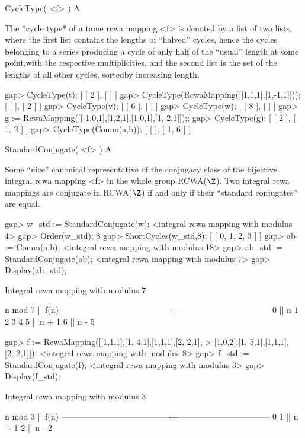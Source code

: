 \>CycleType( <f> ) A

The *cycle type* of a tame rcwa mapping <f> is denoted by a list of two
lists, where the first list contains the lengths of ``halved'' cycles,
hence the cycles belonging to a series producing a cycle of only half
of the ``usual'' length at some point,with the respective
multiplicities, and the second list is the set of the lengths of all
other cycles, sortedby increasing length.

\beginexample
gap> CycleType(t);
[ [ 2 ], [  ] ]
gap> CycleType(RcwaMapping([[1,1,1],[1,-1,1]]));
[ [  ], [ 2 ] ]
gap> CycleType(v);
[ [ 6 ], [  ] ]
gap> CycleType(w);
[ [ 8 ], [  ] ]
gap> g := RcwaMapping([[-1,0,1],[1,2,1],[1,0,1],[1,-2,1]]);;
gap> CycleType(g);
[ [ 2 ], [ 1, 2 ] ]
gap> CycleType(Comm(a,b));
[ [  ], [ 1, 6 ] ]
\endexample

\>StandardConjugate( <f> ) A

Some ``nice'' canonical representative of the conjugacy class of the
bijective integral rcwa mapping <f> in the whole group RCWA($\Z$).
Two integral rcwa mappings are conjugate in RCWA($\Z$) if and only if
their ``standard conjugates'' are equal. 

\beginexample
gap> w_std := StandardConjugate(w);
<integral rcwa mapping with modulus 4>
gap> Order(w_std);
8
gap> ShortCycles(w_std,8);
[ [ 0, 1, 2, 3 ] ]
gap> ab := Comm(a,b);
<integral rcwa mapping with modulus 18>
gap> ab_std := StandardConjugate(ab);
<integral rcwa mapping with modulus 7>
gap> Display(ab_std);

Integral rcwa mapping with modulus 7

               n mod 7                  ||              f(n)
----------------------------------------+---------------------------------
  0                                     || n
  1 2 3 4 5                             || n + 1
  6                                     || n - 5

gap> f := RcwaMapping([[1,1,1],[1, 4,1],[1,1,1],[2,-2,1],
>                      [1,0,2],[1,-5,1],[1,1,1],[2,-2,1]]);
<integral rcwa mapping with modulus 8>
gap> f_std := StandardConjugate(f);
<integral rcwa mapping with modulus 3>
gap> Display(f_std);

Integral rcwa mapping with modulus 3

               n mod 3                  ||              f(n)
----------------------------------------+---------------------------------
  0 1                                   || n + 1
  2                                     || n - 2

